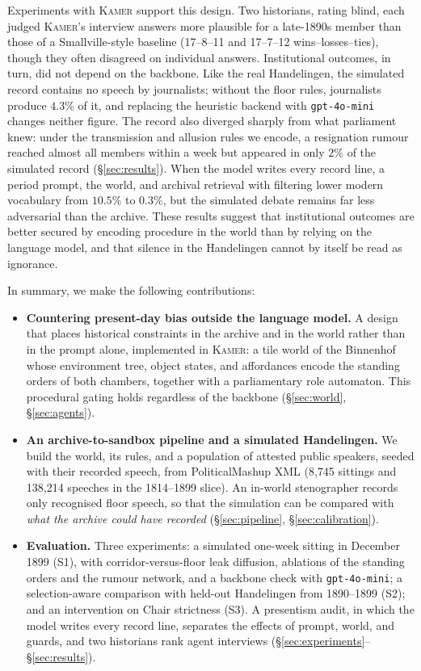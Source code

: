 \documentclass[sigconf,review,anonymous]{acmart}
\newcommand{\sys}{\textsc{Kamer}}
\begin{document}
Experiments with \sys{} support this design. Two historians, rating
blind, each judged \sys{}'s interview answers more plausible for a
late-1890s member than those of a Smallville-style baseline (17--8--11 and
17--7--12 wins--losses--ties), though they often disagreed on individual
answers. Institutional outcomes, in turn, did not depend on the
backbone. Like the real Handelingen, the simulated record contains no
speech by journalists; without the floor rules, journalists produce
$4.3\%$ of it, and replacing the heuristic backend with
\texttt{gpt-4o-mini} changes neither figure. The record also diverged
sharply from what parliament knew: under the transmission and allusion
rules we encode, a resignation rumour reached almost all members within a
week but appeared in only $2\%$ of the simulated record
(\S\ref{sec:results}). When the model writes every record line, a period
prompt, the world, and archival retrieval with filtering lower modern
vocabulary from $10.5\%$ to $0.3\%$, but the simulated debate remains far
less adversarial than the archive. These results suggest that institutional outcomes
are better secured by encoding procedure in the world than by relying on
the language model, and that
silence in the Handelingen cannot by itself be read as ignorance.

In summary, we make the following contributions:
\begin{itemize}[leftmargin=*,nosep]
  \item \textbf{Countering present-day bias outside the language model.} A
  design that places historical constraints in the archive and in the world
  rather than in the prompt alone, implemented in \sys{}: a tile world of
  the Binnenhof whose environment tree, object states, and affordances
  encode the standing orders of both chambers, together with a
  parliamentary role automaton. This procedural gating holds regardless of
  the backbone (\S\ref{sec:world}, \S\ref{sec:agents}).
  \item \textbf{An archive-to-sandbox pipeline and a simulated
  Handelingen.} We build the world, its rules, and a population of attested
  public speakers, seeded with their recorded speech, from PoliticalMashup
  XML (8{,}745 sittings and 138{,}214 speeches in the 1814--1899 slice). An
  in-world stenographer records only recognised floor speech, so that the
  simulation can be compared with \emph{what the archive could have
  recorded} (\S\ref{sec:pipeline}, \S\ref{sec:calibration}).
  \item \textbf{Evaluation.} Three experiments: a simulated one-week
  sitting in December 1899 (S1), with corridor-versus-floor leak diffusion,
  ablations of the standing orders and the rumour network, and a backbone
  check with \texttt{gpt-4o-mini}; a selection-aware comparison with
  held-out Handelingen from 1890--1899 (S2); and an intervention on Chair
  strictness (S3). A presentism audit, in which the model writes every
  record line, separates the effects of prompt, world, and guards, and two
  historians rank agent interviews
  (\S\ref{sec:experiments}--\S\ref{sec:results}).
\end{itemize}
\end{document}
